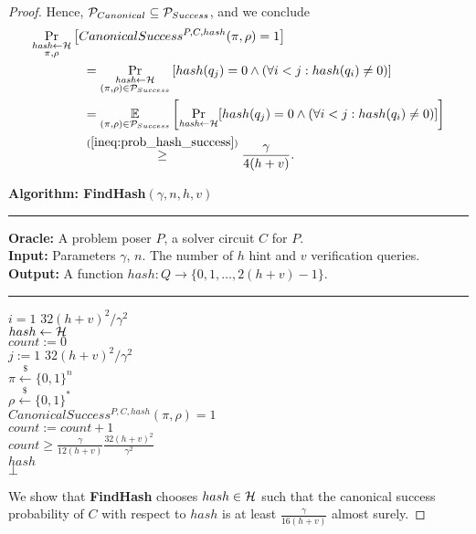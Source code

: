 \begin{proof}
Hence, $\mathcal{P}_{Canonical} \subseteq \mathcal{P}_{Success}$, and we conclude
\begin{align}
  \label{ineq:hash_high_prob}
&\underset{\substack{\textit{hash} \leftarrow \mathcal{H} \\ \pi, \rho}}{\Pr}\left[CanonicalSuccess^{P, C, hash}(\pi, \rho) = 1\right] \notag\\
&\mbox\qquad\qquad = \underset{\substack{\textit{hash} \leftarrow \mathcal{H} \\ (\pi, \rho) \in \mathcal{P}_{Success}}}{\Pr}\left[hash(q_j) = 0 \land (\forall i < j : hash(q_i) \neq 0)\right] \notag\\
&\mbox\qquad\qquad = \underset{{(\pi,\rho) \in \mathcal{P}_{Success}}}{\mathbb{E}}\left[\underset{\substack{\textit{hash} \leftarrow \mathcal{H}}}{\Pr}[hash(q_j) = 0 \land (\forall i < j : hash(q_i) \neq 0)]\right] \notag\\
&\mbox\qquad\qquad \stackrel{(\ref{ineq:prob_hash_success})}{\geq} \frac{\gamma}{4(h+v)}.
\end{align}
%
\begin{codeblock}
  \textbf{Algorithm: FindHash}$(\gamma, n, h, v)$
  \medskip
  \hrule
  \medskip
  \textbf{Oracle:} A problem poser $P$, a solver circuit $C$ for $P$.\\
  \textbf{Input:} Parameters $\gamma$, $n$. The number of $h$ hint and $v$ verification queries. \\
  \textbf{Output:} A function $hash:Q \rightarrow \{0,1, \dots, 2(h+v)-1 \}$.
  \medskip\hrule\medskip
  \For $i = 1$ \To $32(h+v)^2/\gamma^2$ \Do \\
  \IndI $hash \leftarrow{} \mathcal{H}$ \\
  \IndI $count := 0$ \\
  \IndI \For $j := 1$ \To $32(h+v)^2/\gamma^2$ \Do \\
  \IndII $\pi \xleftarrow{\$} \{0,1\}^{n} $\\
  \IndII $\rho \xleftarrow{\$} \{0,1\}^*$ \\
  \IndII \If $CanonicalSuccess^{P, C, hash}(\pi, \rho) = 1$ \Then \\
  \IndIII $count := count + 1$\\
  \IndI \If $count \geq \frac{\gamma}{12(h+v)} \frac{32(h+v)^2}{\gamma^2}$ \Then \\
  \IndII \Return $hash$\\
  \Return $\bot$
\end{codeblock}
We show that \textbf{FindHash} chooses $hash \in \mathcal{H}$ such that the canonical success probability of $C$
with respect to $hash$ is at least $\frac{\gamma}{16(h+v)}$ almost surely.

\end{proof}
